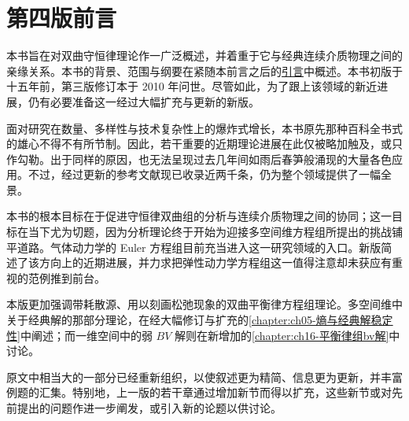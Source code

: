 \documentclass[../../main.tex]{subfiles}
\begin{document}

\chapter*{第四版前言}
\label{chapter:front-preface}

本书旨在对双曲守恒律理论作一广泛概述，并着重于它与经典连续介质物理之间的亲缘关系。本书的背景、范围与纲要在紧随本前言之后的\hyperref[chapter:front-introduction]{引言}中概述。本书初版于十五年前，第三版修订本于 2010 年问世。尽管如此，为了跟上该领域的新近进展，仍有必要准备这一经过大幅扩充与更新的新版。

面对研究在数量、多样性与技术复杂性上的爆炸式增长，本书原先那种百科全书式的雄心不得不有所节制。因此，若干重要的近期理论进展在此仅被略加触及，或只作勾勒。出于同样的原因，也无法呈现过去几年间如雨后春笋般涌现的大量各色应用。不过，经过更新的参考文献现已收录近两千条，仍为整个领域提供了一幅全景。

本书的根本目标在于促进守恒律双曲组的分析与连续介质物理之间的协同；这一目标在当下尤为切题，因为分析理论终于开始为迎接多空间维方程组所提出的挑战铺平道路。气体动力学的 Euler 方程组目前充当进入这一研究领域的入口。新版简述了该方向上的近期进展，并力求把弹性动力学方程组这一值得注意却未获应有重视的范例推到前台。

本版更加强调带耗散源、用以刻画松弛现象的双曲平衡律方程组理论。多空间维中关于经典解的那部分理论，在经大幅修订与扩充的\cref{chapter:ch05-熵与经典解稳定性}中阐述；而一维空间中的弱 $BV$ 解则在新增加的\cref{chapter:ch16-平衡律组bv解}中讨论。

原文中相当大的一部分已经重新组织，以使叙述更为精简、信息更为更新，并丰富例题的汇集。特别地，上一版的若干章通过增加新节而得以扩充，这些新节或对先前提出的问题作进一步阐发，或引入新的论题以供讨论。
\end{document}

